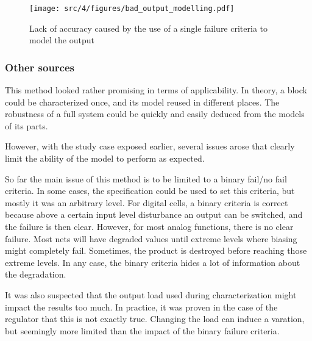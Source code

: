 \begin{figure}[!h]
  \centering
  \texttt{[image: src/4/figures/bad\_output\_modelling.pdf]}
  \caption{Lack of accuracy caused by the use of a single failure criteria to model the output}
  \label{fig:impact-single-failure-criteria}
\end{figure}


\subsubsection{Other sources}


This method looked rather promising in terms of applicability.
In theory, a block could be characterized once, and its model reused in different places.
The robustness of a full system could be quickly and easily deduced from the models of its parts.

However, with the study case exposed earlier, several issues arose that clearly limit the ability of the model to perform as expected.

So far the main issue of this method is to be limited to a binary fail/no fail criteria.
In some cases, the specification could be used to set this criteria, but mostly it was an arbitrary level.
For digital cells, a binary criteria is correct because above a certain input level disturbance an output can be switched, and the failure is then clear.
However, for most analog functions, there is no clear failure.
Most nets will have degraded values until extreme levels where biasing might completely fail.
Sometimes, the product is destroyed before reaching those extreme levels.
In any case, the binary criteria hides a lot of information about the degradation.

It was also suspected that the output load used during characterization might impact the results too much.
In practice, it was proven in the case of the regulator that this is not exactly true.
Changing the load can induce a varation, but seemingly more limited than the impact of the binary failure criteria.

